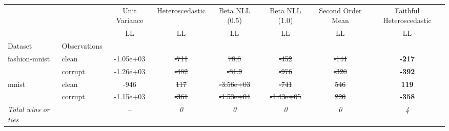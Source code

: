 \begin{tabular}{ll|c|c|c|c|c|c}
\toprule
{} & {} & {Unit Variance} & {Heteroscedastic} & {Beta NLL (0.5)} & {Beta NLL (1.0)} & {Second Order Mean} & {Faithful Heteroscedastic} \\
{} & {} & {LL} & {LL} & {LL} & {LL} & {LL} & {LL} \\
{Dataset} & {Observations} & {} & {} & {} & {} & {} & {} \\
\midrule
\multirow[t]{2}{*}{fashion-mnist} & clean & -1.05e+03 & \sout{-711} & \sout{78.6} & \sout{-452} & \sout{-144} & \textbf{-217} \\
 & corrupt & -1.26e+03 & \sout{-482} & \sout{-81.9} & \sout{-976} & \sout{-320} & \textbf{-392} \\
\multirow[t]{2}{*}{mnist} & clean & -946 & \sout{117} & \sout{-3.56e+03} & \sout{-741} & \sout{546} & \textbf{119} \\
 & corrupt & -1.15e+03 & \sout{-361} & \sout{-1.53e+04} & \sout{-1.43e+05} & \sout{220} & \textbf{-358} \\
\textit{{Total wins or ties}} &  & -- & \textit{0} & \textit{0} & \textit{0} & \textit{0} & \textit{4} \\
\bottomrule
\end{tabular}
